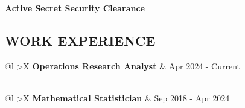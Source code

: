 \documentclass[
  11pt,
]{article}
\begin{document}
\begin{paracol}{2}
\begin{leftcolumn}
\begin{flushleft}
\end{flushleft}
\raggedright
\textbf{Active Secret Security Clearance}
\end{leftcolumn}

\begin{rightcolumn}
\subsection{WORK EXPERIENCE}
\begin{tabularx}{\columnwidth}{@{}l >{\raggedleft\arraybackslash}X}
\textbf{Operations Research Analyst} & {Apr 2024 - Current} \\
 \\
\end{tabularx}

\begin{tabularx}{\columnwidth}{@{}l >{\raggedleft\arraybackslash}X}
\textbf{Mathematical Statistician} & {Sep 2018 - Apr 2024} \\
 \\
\end{tabularx}


\end{rightcolumn}
\end{paracol}
\end{document}
